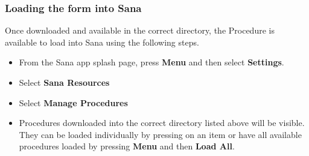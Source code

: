 \documentclass[a4paper,10pt]{article}
\begin{document}
\subsubsection{Loading the form into Sana}
Once downloaded and available in the correct directory, the Procedure is 
available to load into Sana using the following steps.

\begin{itemize}
 \item From the Sana app splash page, press \textbf{Menu} and then select
 \textbf{Settings}.
 \item Select \textbf{Sana Resources} 
 \item Select \textbf{Manage Procedures} 
 \item Procedures downloaded into the correct directory listed above will be 
 visible. They can be loaded individually by pressing on an item or have all
 available procedures loaded by pressing \textbf{Menu} and then
 \textbf{Load All}.
\end{itemize}
\end{document}
